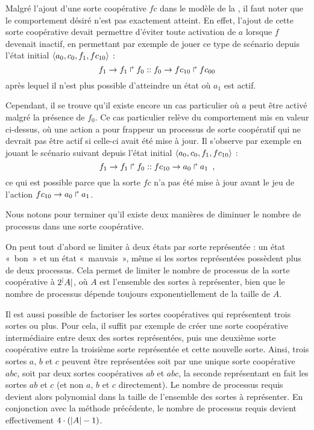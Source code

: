 \begin{example}
  Malgré l'ajout d'une sorte coopérative $fc$ dans le modèle
  de la ,
  il faut noter que le comportement désiré n'est pas exactement atteint.
  En effet, l'ajout de cette sorte coopérative devait permettre d'éviter toute activation de $a$
  lorsque $f$ devenait inactif, en permettant par exemple de jouer ce type de scénario
  depuis l'état initial $\mbox{$\langle a_0, c_0, f_1, fc_{10} \rangle$}$ :
    \[f_1\rightarrow f_1\Rsh f_0 :: f_0\rightarrow fc_{10}\Rsh fc_{00}\]
  après lequel il n'est plus possible d'atteindre un état où $a_1$ est actif.
  
  Cependant, il se trouve qu'il existe encore un cas particulier où $a$ peut être activé
  malgré la présence de $f_0$.
  Ce cas particulier relève du comportement mis en valeur ci-dessus,
  où une action a pour frappeur un processus de sorte coopératif qui ne devrait pas être
  actif si celle-ci avait été mise à jour.
  Il s'observe par exemple en jouant le scénario suivant depuis l'état initial
  $\mbox{$\langle a_0, c_0, f_1, fc_{10} \rangle$}$ :
    \[f_1\rightarrow f_1\Rsh f_0 :: fc_{10}\rightarrow a_0\Rsh a_1 \enspace,\]
  ce qui est possible parce que la sorte $fc$ n'a pas été mise à jour avant le jeu
  de l'action $fc_{10}\rightarrow a_0\Rsh a_1$.
\end{example}

\myskip

Nous notons pour terminer qu'il existe deux manières de diminuer le nombre
de processus dans une sorte coopérative.

On peut tout d'abord se limiter à deux états par sorte représentée :
un état «~bon~» et un état «~mauvais~»,
même si les sortes représentées possèdent plus de deux processus.
Cela permet de limiter le nombre de processus de la sorte coopérative à
$2^|A|$, où $A$ est l'ensemble des sortes à représenter,
bien que le nombre de processus dépende toujours exponentiellement de la taille de $A$.

Il est aussi possible de factoriser les sortes coopératives
qui représentent trois sortes ou plus.
Pour cela, il suffit par exemple de créer une sorte coopérative intermédiaire entre deux des
sortes représentées, puis une deuxième sorte coopérative entre
la troisième sorte représentée et cette nouvelle sorte.
Ainsi, trois sortes $a$, $b$ et $c$ peuvent être représentées soit par une unique
sorte coopérative $abc$, soit par deux sortes coopératives
$ab$ et $abc$, la seconde représentant en fait les sortes $ab$ et $c$
(et non $a$, $b$ et $c$ directement).
Le nombre de processus requis devient alors polynomial dans la taille de l'ensemble
des sortes à représenter.
En conjonction avec la méthode précédente, le nombre de processus requis devient effectivement
$4 \cdot (|A| - 1)$.



